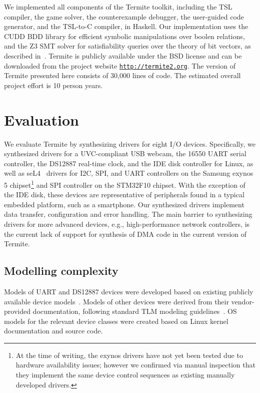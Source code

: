 \documentclass{book}
\newcommand{\termite}{Termite\xspace}
\theoremstyle{definition}
\begin{document}
We implemented all components of the Termite toolkit, including the TSL compiler, the game solver, the counterexample debugger, the user-guided code generator, and the TSL-to-C compiler, in Haskell.  Our implementation uses the CUDD BDD library for efficient symbolic manipulations over boolen relations, and the Z3 SMT solver for satisfiability queries over the theory of bit vectors, as described in~\cite{Walker_Ryzhyk_14}.  Termite is publicly available under the BSD license and can be downloaded from the project website \texttt{\url{http://termite2.org}}. The version of \termite presented here consists of 30,000 lines of code.  The estimated overall project effort is 10 person years. 

\section{Evaluation}
We evaluate \termite by synthesizing drivers for eight I/O devices.  Specifically, we synthesized drivers for a UVC-compliant USB webcam, the 16550 UART serial controller, the DS12887 real-time clock, and the IDE disk controller for Linux, as well as seL4~\cite{Klein_EHACDEEKNSTW_09} drivers for I2C, SPI, and UART controllers on the Samsung exynos 5 chipset\footnote{At the time of writing, the exynos drivers have not yet been tested due to hardware availability issues; however we confirmed via manual inspection that they implement the same device control sequences as existing manually developed drivers.} and SPI controller on the STM32F10 chipset.  With the exception of the IDE disk, these devices are representative of peripherals found in a typical embedded platform, such as a smartphone.  Our synthesized drivers implement data transfer, configuration and error handling.  The main barrier to synthesizing drivers for more advanced devices, e.g., high-performance network controllers, is the current lack of support for synthesis of DMA code in the current version of \termite.  

\subsection{Modelling complexity} 
Models of UART and DS12887 devices were developed based on existing publicly available device models~\cite{ds12887, uart}.  Models of other devices were derived from their vendor-provided documentation, following standard TLM modeling guidelines~\cite{dml_ug}.  OS models for the relevant device classes were created based on Linux kernel documentation and source code.  
\end{document}
